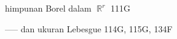 \indexmedskip






















































































himpunan Borel dalam $\BbbR^r$ 111G

----- dan ukuran Lebesgue 114G, 115G, 134F





































